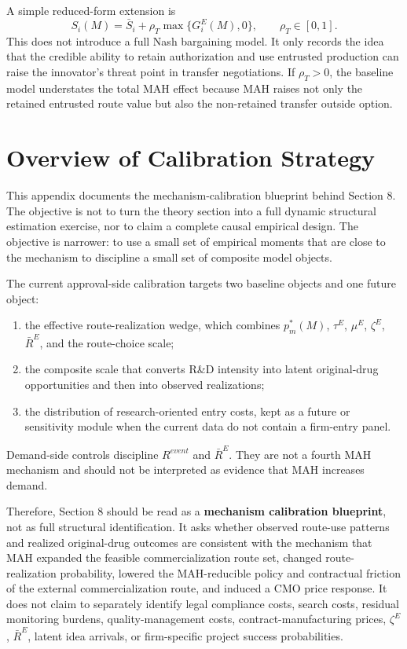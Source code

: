 \documentclass[12pt]{article}
\newcommand{\1}{\mathbf{1}}
\begin{document}
A simple reduced-form extension is
\begin{equation}
    S_i(M)=\bar S_i+\rho_T \max\{G_i^E(M),0\},
    \qquad \rho_T\in[0,1].
    \label{eq:Si_hold_up_extension}
\end{equation}
This does not introduce a full Nash bargaining model. It only records the idea that the credible ability to retain authorization and use entrusted production can raise the innovator's threat point in transfer negotiations. If $\rho_T>0$, the baseline model understates the total MAH effect because MAH raises not only the retained entrusted route value but also the non-retained transfer outside option.

\section{Overview of Calibration Strategy}

This appendix documents the mechanism-calibration blueprint behind Section 8. The objective is not to turn the theory section into a full dynamic structural estimation exercise, nor to claim a complete causal empirical design. The objective is narrower: to use a small set of empirical moments that are close to the mechanism to discipline a small set of composite model objects.

The current approval-side calibration targets two baseline objects and one future object:
\begin{enumerate}[label=(\roman*),leftmargin=2em]
    \item the effective route-realization wedge, which combines $p_m^*(M)$, $\tau^E$, $\mu^E$, $\zeta^E$, $\bar R^E$, and the route-choice scale;
    \item the composite scale that converts R\&D intensity into latent original-drug opportunities and then into observed realizations;
    \item the distribution of research-oriented entry costs, kept as a future or sensitivity module when the current data do not contain a firm-entry panel.
\end{enumerate}

Demand-side controls discipline $R^{event}$ and $\bar R^E$. They are not a fourth MAH mechanism and should not be interpreted as evidence that MAH increases demand.

Therefore, Section 8 should be read as a \textbf{mechanism calibration blueprint}, not as full structural identification. It asks whether observed route-use patterns and realized original-drug outcomes are consistent with the mechanism that MAH expanded the feasible commercialization route set, changed route-realization probability, lowered the MAH-reducible policy and contractual friction of the external commercialization route, and induced a CMO price response. It does not claim to separately identify legal compliance costs, search costs, residual monitoring burdens, quality-management costs, contract-manufacturing prices, $\zeta^E$, $\bar R^E$, latent idea arrivals, or firm-specific project success probabilities.
\end{document}
